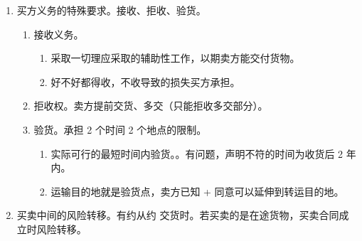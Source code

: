 \begin{enumerate}
\begin{enumerate}
\begin{enumerate}
\begin{enumerate}
                        \end{enumerate}
                \end{enumerate}
          \item 如果有义务归还价款，必须同时从支付价款之日起支付价款利息。
        \end{enumerate}
  \item 买方义务的特殊要求。接收、拒收、验货。
        \begin{enumerate}
          \item 接收义务。
                \begin{enumerate}
                  \item 采取一切理应采取的辅助性工作，以期卖方能交付货物。
                  \item 好不好都得收，不收导致的损失买方承担。
                \end{enumerate}
          \item 拒收权。卖方提前交货、多交（只能拒收多交部分）。
          \item 验货。承担 2 个时间 2 个地点的限制。
                \begin{enumerate}
                  \item 实际可行的最短时间内验货。。有问题，声明不符的时间为收货后 2 年内。
                  \item 运输目的地就是验货点，卖方已知 + 同意可以延伸到转运目的地。
                \end{enumerate}
        \end{enumerate}
  \item 买卖中间的风险转移。\yi 有约从约 \yjt 交货时。\er 若买卖的是在途货物，买卖合同成立时风险转移。
\end{enumerate}
